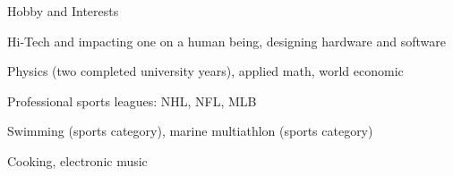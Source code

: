 \documentclass{template}
\begin{document}
\begin{rSection}{Hobby and Interests}

\begin{rHobby}
\item Hi-Tech and impacting one on a human being, designing hardware and software
\item Physics (two completed university years), applied math, world economic
\item Professional sports leagues: NHL, NFL, MLB
\item Swimming (sports category), marine multiathlon (sports category)
\item Cooking, electronic music
\end{rHobby}

\end{rSection}

\end{document}
